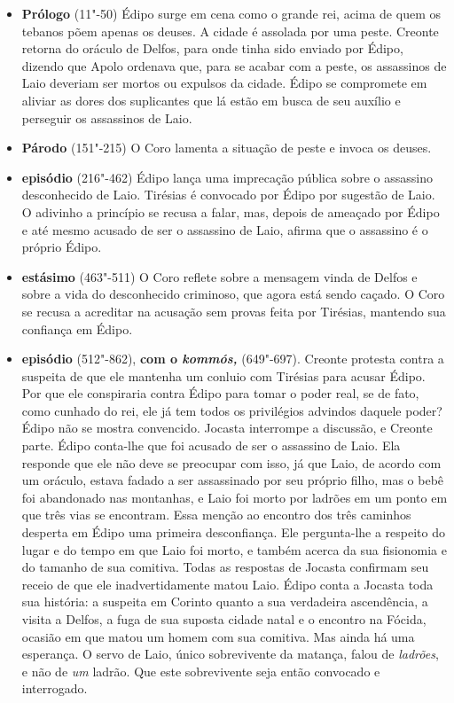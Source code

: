 \begin{itemize}
\item \textbf{Prólogo} (11"-50) Édipo surge em cena como o
grande rei, acima de quem os tebanos põem apenas os deuses. A cidade é
assolada por uma peste. Creonte retorna do oráculo de Delfos, para onde
tinha sido enviado por Édipo, dizendo que Apolo ordenava que, para se
acabar com a peste, os assassinos de Laio deveriam ser mortos ou
expulsos da cidade. Édipo se compromete em aliviar as dores dos
suplicantes que lá estão em busca de seu auxílio e perseguir os
assassinos de Laio.

\item \textbf{Párodo} (151"-215) O Coro lamenta a situação
de peste e invoca os deuses.

\item \textbf{ episódio} (216"-462) Édipo lança uma
imprecação pública sobre o assassino desconhecido de Laio. Tirésias é
convocado por Édipo por sugestão de Laio. O adivinho a princípio se
recusa a falar, mas, depois de ameaçado por Édipo e até mesmo acusado de
ser o assassino de Laio, afirma que o assassino é o próprio
Édipo.

\item \textbf{ estásimo} (463"-511) O Coro reflete sobre a
mensagem vinda de Delfos e sobre a vida do desconhecido criminoso, que
agora está sendo caçado. O Coro se recusa a acreditar na acusação sem
provas feita por Tirésias, mantendo sua confiança em Édipo.

\item \textbf{ episódio} (512"-862), \textbf{com o \emph{kommós,}} (649"-697). 
Creonte protesta contra a suspeita de que ele mantenha um
conluio com Tirésias para acusar Édipo. Por que ele conspiraria contra
Édipo para tomar o poder real, se de fato, como cunhado do rei, ele já
tem todos os privilégios advindos daquele poder? Édipo não se mostra
convencido. Jocasta interrompe a discussão, e Creonte parte. Édipo
conta-lhe que foi acusado de ser o assassino de Laio. Ela responde que
ele não deve se preocupar com isso, já que Laio, de acordo com um
oráculo, estava fadado a ser assassinado por seu próprio filho, mas o
bebê foi abandonado nas montanhas, e Laio foi morto por ladrões em um
ponto em que três vias se encontram. Essa menção ao encontro dos três
caminhos desperta em Édipo uma primeira desconfiança. Ele pergunta-lhe a
respeito do lugar e do tempo em que Laio foi morto, e também acerca da
sua fisionomia e do tamanho de sua comitiva. Todas as respostas de
Jocasta confirmam seu receio de que ele inadvertidamente matou Laio.
Édipo conta a Jocasta toda sua história: a suspeita em Corinto quanto a
sua verdadeira ascendência, a visita a Delfos, a fuga de sua suposta
cidade natal e o encontro na Fócida, ocasião em que matou um homem com
sua comitiva. Mas ainda há uma esperança. O servo de Laio, único
sobrevivente da matança, falou de \emph{ladrões}, e não de \emph{um}
ladrão. Que este sobrevivente seja então convocado e interrogado.


\end{itemize}
